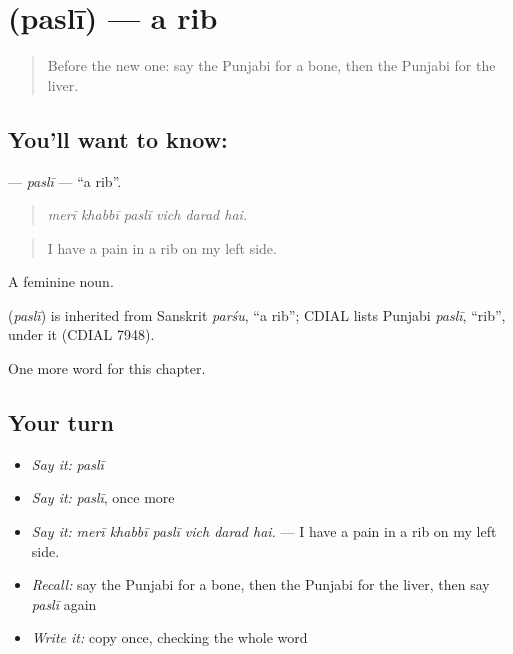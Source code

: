 \section[\texorpdfstring{\pa{ਪਸਲੀ} (paslī)}{ਪਸਲੀ (paslī)}]{ (paslī) — a rib}

\label{lesson:PA-C323-pasli}



\begin{quote}
Before the new one: say the Punjabi for a bone, then the Punjabi for the liver.
\end{quote}

\subsection*{You'll want to know: }
\textbf{} — \emph{paslī} — \textquotedblleft{}a rib\textquotedblright{}.

\begin{quote}
     
\end{quote}

\begin{quote}
\emph{merī khabbī paslī vich darad hai.}
\end{quote}

\begin{quote}
I have a pain in a rib on my left side.
\end{quote}

A feminine noun.

\begin{cousinweb}
\textbf{} (\emph{paslī}) is inherited from Sanskrit \emph{parśu}, \textquotedblleft{}a rib\textquotedblright{}; CDIAL lists Punjabi \emph{paslī}, \textquotedblleft{}rib\textquotedblright{}, under it (CDIAL 7948).
\end{cousinweb}

\begin{grammarlens}[title={What you've built}]
One more word for this chapter.
\end{grammarlens}

\subsection*{Your turn}
\begin{itemize}
\raggedright
  \item \emph{Say it:} \emph{paslī}
  \item \emph{Say it:} \emph{paslī}, once more
  \item \emph{Say it:} \emph{merī khabbī paslī vich darad hai.} — I have a pain in a rib on my left side.
  \item \emph{Recall:} say the Punjabi for a bone, then the Punjabi for the liver, then say \emph{paslī} again
  \item \emph{Write it:} copy \textbf{} once, checking the whole word
\end{itemize}

